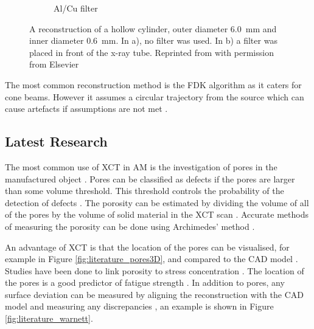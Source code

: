 \begin{figure}
\begin{subfigure}[b]{0.4\textwidth}
      \caption{Al/Cu filter}
    \end{subfigure}
  \caption{A reconstruction of a hollow cylinder, outer diameter \SI{6.0}{\milli\metre} and inner diameter \SI{0.6}{\milli\metre}. In a), no filter was used. In b) a filter was placed in front of the x-ray tube. Reprinted from \citep{kruth2011computed} with permission from Elsevier}
  \label{fig:literature_hardening}
\end{figure}

The most common reconstruction method is the FDK \citep{feldkamp1984practical} algorithm as it caters for cone beams. However it assumes a circular trajectory from the source which can cause artefacts if assumptions are not met \citep{sun2016applications}.

\subsection{Latest Research}

The most common use of XCT in AM is the investigation of pores in the manufactured object \citep{thompson2016x}. Pores can be classified as defects if the pores are larger than some volume threshold. This threshold controls the probability of the detection of defects \citep{gandossi2010probability, amrhein2014characterization}. The porosity can be estimated by dividing the volume of all of the pores by the volume of solid material in the XCT scan \citep{taud2005porosity}. Accurate methods of measuring the porosity can be done using Archimedes' method \citep{spierings2011comparison}.

An advantage of XCT is that the location of the pores can be visualised, for example in Figure \ref{fig:literature_pores3D}, and compared to the CAD model \citep{lee2015compliance, villarraga2015assessing, kim2016inspection}. Studies have been done to link porosity to stress concentration \citep{leuders2015fatigue, siddique2015computed, carlton2016damage}. The location of the pores is a good predictor of fatigue strength \citep{leuders2015fatigue}. In addition to pores, any surface deviation can be measured by aligning the reconstruction with the CAD model and measuring any discrepancies \citep{lee2015compliance, villarraga2015assessing, kim2016inspection}, an example is shown in Figure \ref{fig:literature_warnett}.

